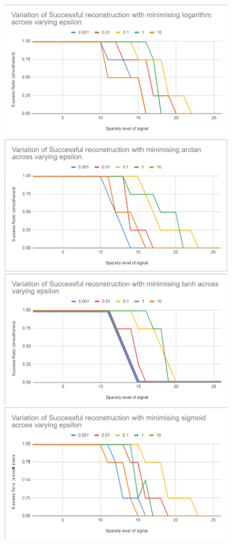 \documentclass[a4paper,14pt]{article}
\numberwithin{definition}{section}
\numberwithin{mytheorem}{subsection}
\begin{document}
\begin{center}
    \includegraphics[width=10cm]{log_epsilon.png}
    \includegraphics[width=10cm]{atan_epsilon.png}
    \includegraphics[width=10cm]{tanh_epsilon.png}
    \includegraphics[width=10cm]{sigmoid_epsilon.png}
\end{center}
\end{document}
